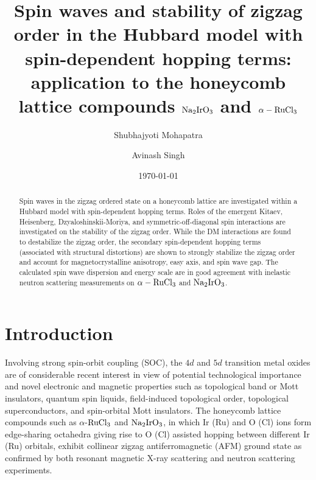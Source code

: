 \documentclass[aps,prb,fleqn,12pt,amsmath,amssymb]{revtex4}
\begin{document}
\title{Spin waves and stability of zigzag order in the Hubbard model with spin-dependent hopping terms: application to the honeycomb lattice compounds {\boldmath ${\rm Na_2 Ir O_3}$} and {\boldmath ${\rm \alpha - Ru Cl_3}$}}
\author{Shubhajyoti Mohapatra}
\author{Avinash Singh}
\date{\today} 

\begin{abstract}

Spin waves in the zigzag ordered state on a honeycomb lattice are investigated within a Hubbard model with spin-dependent hopping terms. Roles of the emergent Kitaev, Heisenberg, Dzyaloshinskii-Moriya, and symmetric-off-diagonal spin interactions are investigated on the stability of the zigzag order. While the DM interactions are found to destabilize the zigzag order, the secondary spin-dependent hopping terms (associated with structural distortions) are shown to strongly stabilize the zigzag order and account for magnetocrystalline anisotropy, easy axis, and spin wave gap. The calculated spin wave dispersion and energy scale are in good agreement with inelastic neutron scattering measurements on $\rm \alpha - RuCl_3$ and $\rm Na_2 Ir O_3$. 

\end{abstract}

\maketitle
\newpage

\section{Introduction}

Involving strong spin-orbit coupling (SOC), the $4d$ and $5d$ transition metal oxides are of considerable recent interest in view of potential technological importance and novel electronic and magnetic properties such as topological band or Mott insulators, quantum spin liquids, field-induced topological order, topological superconductors, and spin-orbital Mott insulators. The honeycomb lattice compounds such as $\alpha$-$\rm{RuCl_3}$ and $\rm Na_2IrO_3$, in which Ir (Ru) and O (Cl) ions form edge-sharing octahedra giving rise to O (Cl) assisted hopping between different Ir (Ru) orbitals, exhibit collinear zigzag antiferromagnetic (AFM) ground state as confirmed by both resonant magnetic X-ray scattering and neutron scattering experiments.\cite{liu_PRB_2011,choi_PRL_2012,ye_PRB_2012,johnson_PRB_2015,sears_PRB_2015}
\end{document}
